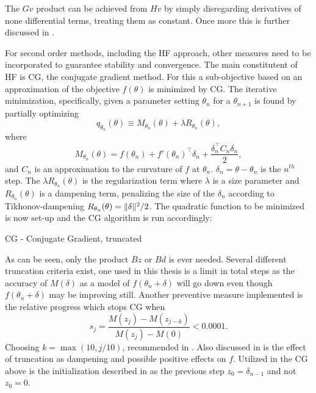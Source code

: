 The $Gv$ product can be achieved from $Hv$ by simply disregarding derivatives of none differential terms, treating them as constant. Once more this is further discussed in \cite{suts}.

For second order methods, including the HF approach, other measures need to be incorporated to guarantee stability and convergence. The main constitutent of HF is CG, the conjugate gradient method. For this a sub-objective based on an approximation of the objective $f(\theta)$ is minimized by CG. The iterative minimization, specifically, given a parameter setting $\theta_n$ for a $\theta_{n+1}$ is found by partially optimizing \[q_{\theta_n} (\theta) \equiv M_{\theta_n}(\theta) + \lambda R_{\theta_n}(\theta),\] where \[M_{\theta_n}(\theta) = f(\theta_n) + f'(\theta_n)^\top \delta_n + \frac{\delta_n^\top C_n \delta_n}{2},\] and $C_n$ is an approximation to the curvature of $f$ at $\theta_n$. $\delta_n = \theta - \theta_n$ is the $n^{th}$ step. The $\lambda R_{\theta_n}(\theta)$ is the regularization term where $\lambda$ is a size parameter and $R_{\theta_n}(\theta)$ is a dampening term, penalizing the size of the $\delta_n$ according to Tikhonov-dampening $R_{\theta_n}(\theta) = \lVert\delta\rVert^2/2$. The quadratic function to be minimized is now set-up and the CG algorithm is run accordingly:

\begin{algorithm}
    \caption{CG - Conjugate Gradient, truncated}
    \begin{algorithmic}[1]
        \EndWhile
    \end{algorithmic}
\end{algorithm}

As can be seen, only the product $Bz$ or $Bd$ is ever needed. Several different truncation criteria exist, one used in this thesis is a limit in total steps as the accuracy of $M(\delta)$ as a model of $f(\theta_n + \delta)$ will go down even though $f(\theta_n + \delta)$ may be improving still. Another preventive measure implemented is the relative progress which stops CG when \[s_j = \frac{M(z_j) - M(z_{j-k})}{M(z_j) - M(0)} < 0.0001.\]  Choosing $k= \max (10, j/10)$, recommended in \cite{suts}. Also discussed in \textcite{Martens2012} is the effect of truncation as dampening and possible positive effects on $f$. Utilized in the CG above is the initialization described in \cite{Martens2012} as the previous step $z_0 = \delta_{n-1}$ and not $z_0 = 0$.

